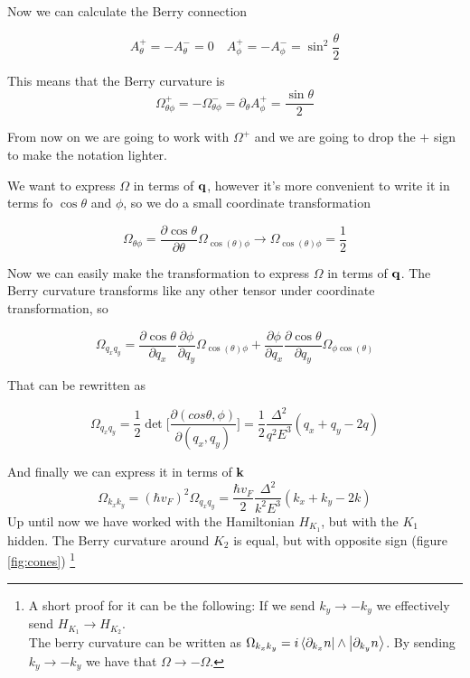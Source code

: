 Now we can calculate the Berry connection

\begin{equation}
    A_\theta^+=-A_\theta^-=0 \quad A_\phi^+=-A_\phi^-=\sin^2\frac \theta 2
\end{equation}

This means that the Berry curvature is
\begin{equation}
    \Omega^+_{\theta\phi}=-\Omega^-_{\theta\phi}=\partial_\theta A^+_\phi=\frac{\sin \theta}2
\end{equation}

From now on we are going to work with $\Omega^+$ and we are going to drop the $+$ sign to make the notation lighter.

We want to express $\Omega$ in terms of $\mathbf{q}$, however it's more convenient to write it in terms fo  $\cos \theta$ and $\phi$, so we do a small coordinate transformation


\begin{equation}
    \Omega_{\theta\phi}=\frac{\partial\cos\theta}{\partial \theta}\Omega_{\cos(\theta)\phi} \rightarrow \Omega_{\cos(\theta)\phi}=\frac 12
\end{equation}



Now we can easily make the transformation to express $\Omega$ in terms of $\mathbf{q}$. The Berry curvature transforms like any other tensor under coordinate transformation, so

\begin{equation}
    \Omega_{q_xq_y}=\frac{\partial\cos \theta}{\partial q_x}\frac{\partial \phi}{\partial q_y}\Omega_{\cos(\theta)\phi}+\frac{\partial \phi}{\partial q_x}\frac{\partial\cos \theta}{\partial q_y}\Omega_{\phi\cos(\theta)} 
\end{equation}

That can be rewritten as

\begin{equation}
    \Omega_{q_xq_y}=\frac 12 \det\bigg[\frac{\partial (cos\theta,\phi)}{\partial (q_x,q_y)}\bigg]=\frac 12 \frac{\Delta^2}{q^2E^3}(q_x+q_y-2q)
\end{equation}


And finally we can express it in terms of $\mathbf{k}$
\begin{equation}
    \Omega_{k_xk_y}=(\hbar v_F)^2\Omega_{q_xq_y}=\frac {\hbar v_F}2 \frac{\Delta^2}{k^2E^3}(k_x+k_y-2k)
\end{equation}
Up until now we have worked with the Hamiltonian $H_{K_1}$, but with the $K_1$ hidden. The Berry curvature around $K_2$ is equal, but with opposite sign (figure \ref{fig:cones})
\footnote{
    A short proof for it can be the following: If we send $k_y\to -k_y$ we effectively send $H_{K_1}\to H_{K_2}$.\\
    The berry curvature can be written as $\Omega_{k_xk_y}=i\bra{\partial _{k_x}n}\wedge\ket{\partial_{k_y}n}$. By sending  $k_y\to -k_y$ we have that $\Omega\to-\Omega$.}

